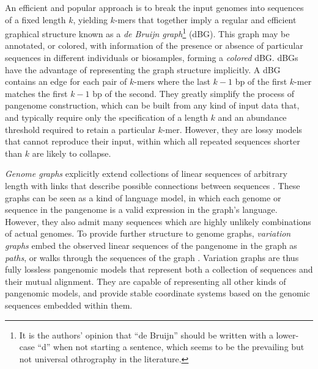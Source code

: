 An efficient and popular approach is to break the input genomes into sequences of a fixed length $k$, yielding $k$-mers that together imply a regular and efficient graphical structure known as a \emph{de Bruijn graph}\footnote{It is the authors' opinion that ``de Bruijn'' should be written with a lower-case ``d'' when not starting a sentence, which seems to be the prevailing but not universal othrography in the literature.} (dBG).
This graph may be annotated, or colored, with information of the presence or absence of particular sequences in different individuals or biosamples, forming a \emph{colored} dBG.
dBGs have the advantage of representing the graph structure implicitly.
A dBG contains an edge for each pair of $k$-mers where the last $k-1$ bp of the first $k$-mer matches the first $k-1$ bp of the second.
They greatly simplify the process of pangenome construction, which can be built from any kind of input data that, and typically require only the specification of a length $k$ and an abundance threshold required to retain a particular $k$-mer.
However, they are lossy models that cannot reproduce their input, within which all repeated sequences shorter than $k$ are likely to collapse.

\emph{Genome graphs} explicitly extend collections of linear sequences of arbitrary length with links that describe possible connections between sequences \cite{Paten_2017}.
These graphs can be seen as a kind of language model, in which each genome or sequence in the pangenome is a valid expression in the graph's language.
However, they also admit many sequences which are highly unlikely combinations of actual genomes.
To provide further structure to genome graphs, \emph{variation graphs} embed the observed linear sequences of the pangenome in the graph as \emph{paths}, or walks through the sequences of the graph \cite{Garrison_2018}.
Variation graphs are thus fully lossless pangenomic models that represent both a collection of sequences and their mutual alignment.
They are capable of representing all other kinds of pangenomic models, and provide stable coordinate systems based on the genomic sequences embedded within them.





